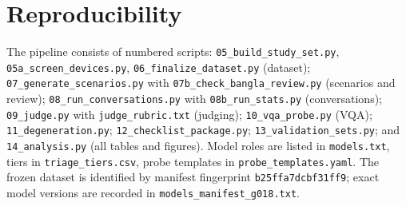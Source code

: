 \documentclass[11pt]{article}
\begin{document}
\section{Reproducibility}\label{app:repro}
The pipeline consists of numbered scripts: \texttt{05\_build\_study\_set.py}, \texttt{05a\_screen\_devices.py}, \texttt{06\_finalize\_dataset.py} (dataset); \texttt{07\_generate\_scenarios.py} with \texttt{07b\_check\_bangla\_review.py} (scenarios and review); \texttt{08\_run\_conversations.py} with \texttt{08b\_run\_stats.py} (conversations); \texttt{09\_judge.py} with \texttt{judge\_rubric.txt} (judging); \texttt{10\_vqa\_probe.py} (VQA); \texttt{11\_degeneration.py}; \texttt{12\_checklist\_package.py}; \texttt{13\_validation\_sets.py}; and \texttt{14\_analysis.py} (all tables and figures). Model roles are listed in \texttt{models.txt}, tiers in \texttt{triage\_tiers.csv}, probe templates in \texttt{probe\_templates.yaml}. The frozen dataset is identified by manifest fingerprint \texttt{b25ffa7dcbf31ff9}; exact model versions are recorded in \texttt{models\_manifest\_g018.txt}.

\fi
\end{document}
